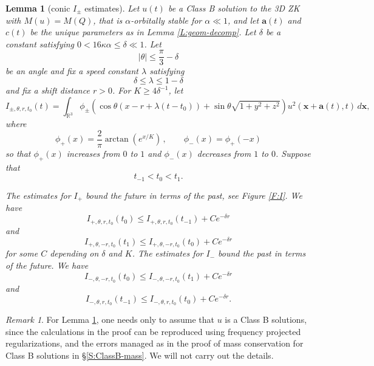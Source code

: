 \documentclass[12pt,letterpaper]{amsart}
\newtheorem{lemma}[theorem]{Lemma}
\theoremstyle{remark}
\newtheorem{remark}[theorem]{Remark}
\numberwithin{equation}{section}
\numberwithin{theorem}{section}
\numberwithin{table}{section}
\begin{document}
\begin{lemma}[conic $I_\pm$ estimates]
\label{L:Ipm-estimates}
Let $u(t)$ be a Class B solution to the 3D ZK with $M(u)=M(Q)$,  that is $\alpha$-orbitally stable for $\alpha \ll 1$, and let $\mathbf{a}(t)$ and $c(t)$ be the unique parameters as in Lemma \ref{L:geom-decomp}.  Let $\delta$ be a constant satisfying $0<16\kappa \alpha \leq \delta \ll 1$.  Let 
$$|\theta| \leq \frac{\pi}{3}-\delta$$ 
be an angle and fix a speed constant $\lambda$ satisfying 
\begin{equation}
\label{E:mon4}
\delta \leq \lambda \leq 1-\delta
\end{equation}
and fix a shift distance $r>0$.  For $K\geq 4\delta^{-1}$, let
\begin{equation}
\label{E:Ipm-de}
I_{\pm, \theta, r, t_0} (t) = \int_{\mathbb{R}^3} \phi_\pm \left(  \cos \theta(x-r+\lambda(t-t_0)) +  \sin \theta \sqrt{1+y^2+z^2} \right) u^2(\mathbf{x}+\mathbf{a}(t), t) \, d\mathbf{x},
\end{equation}
where
$$
\phi_+(x) = \frac{2}{\pi} \operatorname{arctan}(e^{x/K}) \,, \qquad \phi_-(x) = \phi_+(-x)
$$
so that $\phi_+(x)$ increases from $0$ to $1$ and $\phi_-(x)$ decreases from $1$ to $0$.  
Suppose that 
$$
t_{-1}<t_0<t_1.
$$

The estimates for $I_+$ bound the \emph{future in terms of the past}, see Figure \ref{F:I}. We have
\begin{equation}
\label{E:Ip-right}
I_{+,\theta, r,t_0}(t_0) \leq I_{+,\theta, r,t_0}(t_{-1}) + C e^{-\delta r}
\end{equation}
and
\begin{equation}
\label{E:Ip-left}
I_{+,\theta, -r,t_0}(t_1) \leq I_{+,\theta, -r,t_0}(t_0) + Ce^{-\delta r}
\end{equation}
for some $C$ depending on $\delta$ and $K$. The estimates for $I_-$ bound the \emph{past in terms of the future}.  We have
\begin{equation}
\label{E:Im-left}
I_{-,\theta,-r,t_0}(t_0) \leq I_{-,\theta,-r,t_0}(t_1) + Ce^{-\delta r}
\end{equation}
and
\begin{equation}
\label{E:Im-right}
I_{-,\theta, r,t_0}(t_{-1}) \leq I_{-,\theta, r,t_0}(t_0) + Ce^{-\delta r}.
\end{equation}
\end{lemma}

\begin{remark}
For Lemma \ref{L:Ipm-estimates}, one needs only to assume that $u$ is a Class B solutions, since the calculations in the proof can be reproduced using frequency projected regularizations, and the errors managed as in the proof of mass conservation for Class B solutions in \S\ref{S:ClassB-mass}.  We will not carry out the details.
\end{remark}
\end{document}
